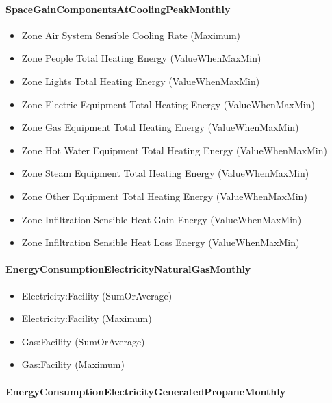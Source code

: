 \paragraph{SpaceGainComponentsAtCoolingPeakMonthly}\label{spacegaincomponentsatcoolingpeakmonthly}

\begin{itemize}
\item
  Zone Air System Sensible Cooling Rate (Maximum)
\item
  Zone People Total Heating Energy (ValueWhenMaxMin)
\item
  Zone Lights Total Heating Energy (ValueWhenMaxMin)
\item
  Zone Electric Equipment Total Heating Energy (ValueWhenMaxMin)
\item
  Zone Gas Equipment Total Heating Energy (ValueWhenMaxMin)
\item
  Zone Hot Water Equipment Total Heating Energy (ValueWhenMaxMin)
\item
  Zone Steam Equipment Total Heating Energy (ValueWhenMaxMin)
\item
  Zone Other Equipment Total Heating Energy (ValueWhenMaxMin)
\item
  Zone Infiltration Sensible Heat Gain Energy (ValueWhenMaxMin)
\item
  Zone Infiltration Sensible Heat Loss Energy (ValueWhenMaxMin)
\end{itemize}

\paragraph{EnergyConsumptionElectricityNaturalGasMonthly}\label{energyconsumptionelectricitynaturalgasmonthly}

\begin{itemize}
\item
  Electricity:Facility (SumOrAverage)
\item
  Electricity:Facility (Maximum)
\item
  Gas:Facility (SumOrAverage)
\item
  Gas:Facility (Maximum)
\end{itemize}

\paragraph{EnergyConsumptionElectricityGeneratedPropaneMonthly}\label{energyconsumptionelectricitygeneratedpropanemonthly}

